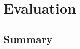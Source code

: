 \documentclass[../Main/thesis.tex]{subfiles}
\begin{document}
\chapter{Evaluation}%
\label{ch:evaluation}


\section*{Summary}%
\label{sec:evaluation_summary}



\blankpage
\end{document}
